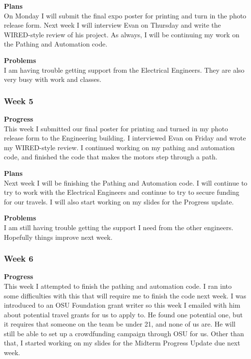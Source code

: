 \textbf{Plans} \\ 
On Monday I will submit the final expo poster for printing and turn in the photo release form. Next week I will interview Evan on Thursday and write the WIRED-style review of his project. As always, I will be continuing my work on the Pathing and Automation code.

\textbf{Problems} \\ 
I am having trouble getting support from the Electrical Engineers. They are also very busy with work and classes.


\subsubsection{Week 5}
\textbf{Progress} \\ 
This week I submitted our final poster for printing and turned in my photo release form to the Engineering building. I interviewed Evan on Friday and wrote my WIRED-style review. I continued working on my pathing and automation code, and finished the code that makes the motors step through a path.

\textbf{Plans} \\ 
Next week I will be finishing the Pathing and Automation code. I will continue to try to work with the Electrical Engineers and continue to try to secure funding for our travels. I will also start working on my slides for the Progress update.

\textbf{Problems} \\ 
I am still having trouble getting the support I need from the other engineers. Hopefully things improve next week.


\subsubsection{Week 6}
\textbf{Progress} \\ 
This week I attempted to finish the pathing and automation code. I ran into some difficulties with this that will require me to finish the code next week. I was introduced to an OSU Foundation grant writer so this week I emailed with him about potential travel grants for us to apply to. He found one potential one, but it requires that someone on the team be under 21, and none of us are. He will still be able to set up a crowdfunding campaign through OSU for us. Other than that, I started working on my slides for the Midterm Progress Update due next week.

